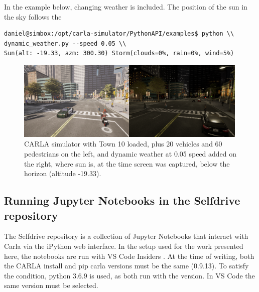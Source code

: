 In the example below, changing weather is included. The position of the sun in the sky follows the 

\begin{verbatim}
daniel@simbox:/opt/carla-simulator/PythonAPI/examples$ python \\ 
dynamic_weather.py --speed 0.05 \\
Sun(alt: -19.33, azm: 300.30) Storm(clouds=0%, rain=0%, wind=5%)           
\end{verbatim}


\begin{figure}[h]
    \centering
    \includegraphics[width=0.99\textwidth]{Figures/Methods/CARLA_Traffic_Weather_Combined.png}
    \caption{CARLA simulator with Town 10 loaded, plus 20 vehicles and 60 pedestrians on the left, and dynamic weather at 0.05 speed added on the right, where sun is, at the time screen was captured, below the horizon (altitude -19.33).}
    \label{fig:CARLA_Traffic_Weather_Combined}
\end{figure}

\subsection{Running Jupyter Notebooks in the Selfdrive repository}

The Selfdrive repository is a collection of Jupyter Notebooks that interact with Carla via the iPython web interface. In the setup used for the work presented here, the notebooks are run with VS Code Insiders \cite{todo}. At the time of writing, both the CARLA install and pip carla versions must be the same (0.9.13). To satisfy the condition, python 3.6.9 is used, as both run with the version. In VS Code the same version must be selected.

